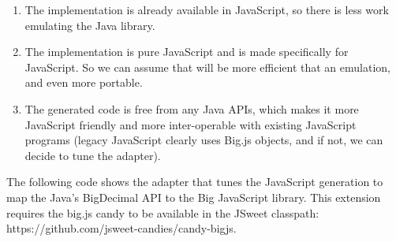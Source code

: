 \documentclass[a4paper]{report}
\begin{document}
\begin{enumerate}
\item The implementation is already available in JavaScript, so there is less work emulating the Java library.
\item The implementation is pure JavaScript and is made specifically for JavaScript. So we can assume that will be more efficient that an emulation, and even more portable.
\item The generated code is free from any Java APIs, which makes it more JavaScript friendly and more inter-operable with existing JavaScript programs (legacy JavaScript clearly uses Big.js objects, and if not, we can decide to tune the adapter).
\end{enumerate}

The following code shows the adapter that tunes the JavaScript generation to map the Java's BigDecimal API to the Big JavaScript library. This extension requires the big.js candy to be available in the JSweet classpath: https://github.com/jsweet-candies/candy-bigjs.
\end{document}
